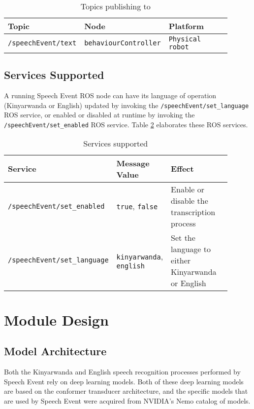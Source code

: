 \documentclass{CSSRforAfrica}
\begin{document}
\begin{center}
\begin{table}[thb]
\begin{tabular}[thb]{|p{0.30\linewidth}|p{0.30\linewidth}|p{0.30\linewidth}|} \hline
\rowcolor{lightgray} Topic & Node & Platform \\ \hline
\texttt{/speechEvent/text} & \texttt{behaviourController} & \texttt{Physical robot} \\ \hline
\end{tabular}
\caption{Topics publishing to}
\label{table:topics-pub}
\end{table}
\end{center}

\subsection{Services Supported}

A running Speech Event ROS node can have its language of operation (Kinyarwanda or English) updated by invoking the \texttt{/speechEvent/set\_language} ROS service, or enabled or disabled at runtime by invoking the \texttt{/speechEvent/set\_enabled} ROS service. Table \ref{table:services} elaborates these ROS services.

\begin{center}
\begin{table}[thb]
\begin{tabular}[thb]{|p{0.36\linewidth}|p{0.18\linewidth}|p{0.36\linewidth}|} \hline
\rowcolor{lightgray} Service & Message Value & Effect \\ \hline
\texttt{/speechEvent/set\_enabled} & \texttt{true}, \texttt{false} & Enable or disable the transcription process \\ \hline
\texttt{/speechEvent/set\_language} & \texttt{kinyarwanda}, \texttt{english} & Set the language to either Kinyarwanda or English \\ \hline
\end{tabular}
\caption{Services supported}
\label{table:services}
\end{table}
\end{center}


\newpage
\section{Module Design}
\subsection{Model Architecture}
Both the Kinyarwanda and English speech recognition processes performed by Speech Event rely on deep learning models. Both of these deep learning models are based on the conformer transducer architecture, and the specific models that are used by Speech Event were acquired from NVIDIA's Nemo catalog of models.
\end{document}
